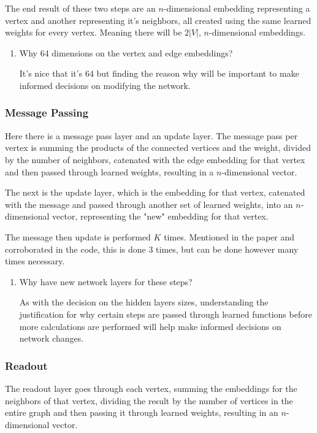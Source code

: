 \documentclass{article}
\begin{document}
The end result of these two steps are an $n$-dimensional embedding representing a vertex and another representing it's neighbors, all created using the same learned weights for every vertex. Meaning there will be $2|V|$, $n$-dimensional embeddings. 


\begin{enumerate}
    \item Why 64 dimensions on the vertex and edge embeddings? 
    
    It's nice that it's 64 but finding the reason why will be important to make informed decisions on modifying the network.
\end{enumerate}

\subsubsection{Message Passing}

Here there is a message pass layer and an update layer. The message pass per vertex is summing the products of the connected vertices and the weight, divided by the number of neighbors, catenated with the edge embedding for that vertex and then passed through learned weights, resulting in a $n$-dimensional vector.

The next is the update layer, which is the embedding for that vertex, catenated with the message and passed through another set of learned weights, into an $n$-dimensional vector, representing the "new" embedding for that vertex. 

The message then update is performed $K$ times. Mentioned in the paper and corroborated in the code, this is done 3 times, but can be done however many times necessary.

\begin{enumerate}
    \item Why have new network layers for these steps?
    
    As with the decision on the hidden layers sizes, understanding the justification for why certain steps are passed through learned functions before more calculations are performed will help make informed decisions on network changes.
\end{enumerate}

\subsubsection{Readout}

The readout layer goes through each vertex, summing the embeddings for the neighbors of that vertex, dividing the result by the number of vertices in the entire graph and then passing it through learned weights, resulting in an $n$-dimensional vector.
\end{document}
